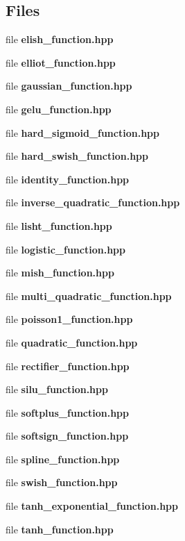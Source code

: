 \subsection*{Files}
\begin{DoxyCompactItemize}
\item 
file \textbf{ elish\+\_\+function.\+hpp}
\item 
file \textbf{ elliot\+\_\+function.\+hpp}
\item 
file \textbf{ gaussian\+\_\+function.\+hpp}
\item 
file \textbf{ gelu\+\_\+function.\+hpp}
\item 
file \textbf{ hard\+\_\+sigmoid\+\_\+function.\+hpp}
\item 
file \textbf{ hard\+\_\+swish\+\_\+function.\+hpp}
\item 
file \textbf{ identity\+\_\+function.\+hpp}
\item 
file \textbf{ inverse\+\_\+quadratic\+\_\+function.\+hpp}
\item 
file \textbf{ lisht\+\_\+function.\+hpp}
\item 
file \textbf{ logistic\+\_\+function.\+hpp}
\item 
file \textbf{ mish\+\_\+function.\+hpp}
\item 
file \textbf{ multi\+\_\+quadratic\+\_\+function.\+hpp}
\item 
file \textbf{ poisson1\+\_\+function.\+hpp}
\item 
file \textbf{ quadratic\+\_\+function.\+hpp}
\item 
file \textbf{ rectifier\+\_\+function.\+hpp}
\item 
file \textbf{ silu\+\_\+function.\+hpp}
\item 
file \textbf{ softplus\+\_\+function.\+hpp}
\item 
file \textbf{ softsign\+\_\+function.\+hpp}
\item 
file \textbf{ spline\+\_\+function.\+hpp}
\item 
file \textbf{ swish\+\_\+function.\+hpp}
\item 
file \textbf{ tanh\+\_\+exponential\+\_\+function.\+hpp}
\item 
file \textbf{ tanh\+\_\+function.\+hpp}
\end{DoxyCompactItemize}

